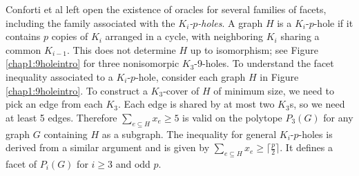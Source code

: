 Conforti et al left open the existence of oracles for several families of facets, including the family associated with the {\em $K_i$-$p$-holes}. 
A graph $H$ is a $K_i$-$p$-hole if it contains $p$ copies of $K_i$ arranged in a cycle, with neighboring $K_i$ sharing a common $K_{i-1}$. 
This does not determine $H$ up to isomorphism; see Figure \ref{chap1:9holeintro} for three nonisomorpic $K_3$-9-holes.
To understand the facet inequality associated to a $K_i$-$p$-hole, consider each graph $H$ in Figure \ref{chap1:9holeintro}. 
To construct a $K_3$-cover of $H$ of minimum size, we need to pick an edge from each $K_3$. 
Each edge is shared by at most two $K_3$s, so we need at least 5 edges.
Therefore $\sum_{e \subseteq H} x_e \ge 5$ is valid on the polytope $P_3(G)$ for any graph $G$ containing $H$ as a subgraph. 
The inequality for general $K_i$-$p$-holes is derived from a similar argument and is given by $\sum_{e \subseteq H} x_e \ge \lceil \frac{p}{2} \rceil$.
It defines a facet of $P_i(G)$ for $i \ge 3$ and odd $p$.

